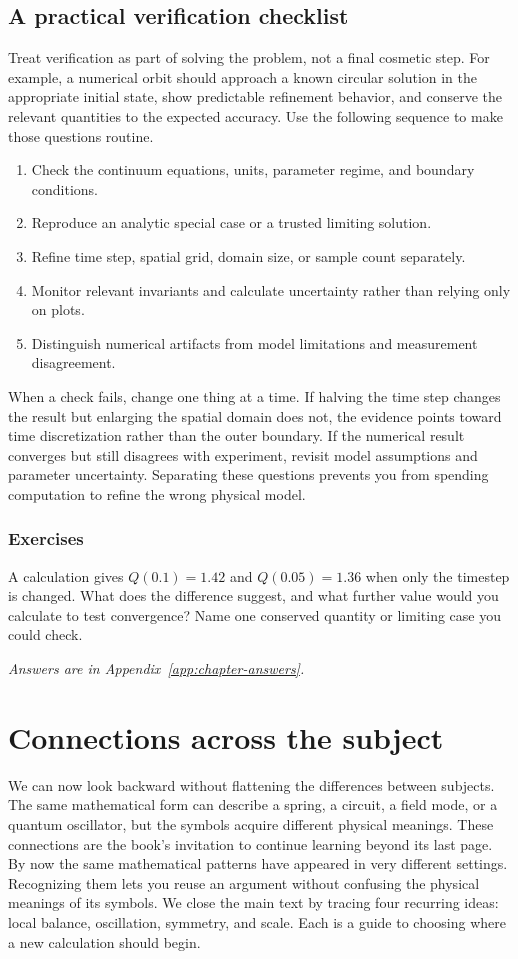 \documentclass[11pt,oneside]{book}
\theoremstyle{reviewstyle}
\newcommand{\learningcheck}[1]{\subsection*{Exercises}\noindent #1\par\smallskip\noindent\emph{Answers are in Appendix~\ref{app:chapter-answers}.}}
\begin{document}
\section{A practical verification checklist}
Treat verification as part of solving the problem, not a final cosmetic step. For example, a numerical orbit should approach a known circular solution in the appropriate initial state, show predictable refinement behavior, and conserve the relevant quantities to the expected accuracy. Use the following sequence to make those questions routine.

\begin{enumerate}
\item Check the continuum equations, units, parameter regime, and boundary conditions.
\item Reproduce an analytic special case or a trusted limiting solution.
\item Refine time step, spatial grid, domain size, or sample count separately.
\item Monitor relevant invariants and calculate uncertainty rather than relying only on plots.
\item Distinguish numerical artifacts from model limitations and measurement disagreement.
\end{enumerate}

When a check fails, change one thing at a time. If halving the time step changes the result but enlarging the spatial domain does not, the evidence points toward time discretization rather than the outer boundary. If the numerical result converges but still disagrees with experiment, revisit model assumptions and parameter uncertainty. Separating these questions prevents you from spending computation to refine the wrong physical model.

\learningcheck{A calculation gives $Q(0.1)=1.42$ and $Q(0.05)=1.36$ when only the timestep is changed. What does the difference suggest, and what further value would you calculate to test convergence? Name one conserved quantity or limiting case you could check.}

\chapter{Connections across the subject}
We can now look backward without flattening the differences between subjects. The same mathematical form can describe a spring, a circuit, a field mode, or a quantum oscillator, but the symbols acquire different physical meanings. These connections are the book's invitation to continue learning beyond its last page.
By now the same mathematical patterns have appeared in very different settings. Recognizing them lets you reuse an argument without confusing the physical meanings of its symbols. We close the main text by tracing four recurring ideas: local balance, oscillation, symmetry, and scale. Each is a guide to choosing where a new calculation should begin.
\end{document}
